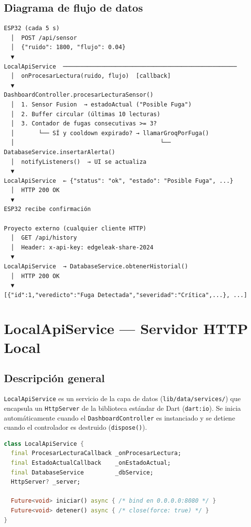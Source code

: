 \documentclass[12pt,a4paper]{article}
\begin{document}
\subsection{Diagrama de flujo de datos}

\begin{mdframed}[linecolor=primaryblue,linewidth=1pt,backgroundcolor=blue!3]
\begin{verbatim}
ESP32 (cada 5 s)
  │  POST /api/sensor
  │  {"ruido": 1800, "flujo": 0.04}
  ▼
LocalApiService  ──────────────────────────────────────────────────
  │  onProcesarLectura(ruido, flujo)  [callback]
  ▼
DashboardController.procesarLecturaSensor()
  │  1. Sensor Fusion  → estadoActual ("Posible Fuga")
  │  2. Buffer circular (últimas 10 lecturas)
  │  3. Contador de fugas consecutivas >= 3?
  │       └── SÍ y cooldown expirado? → llamarGroqPorFuga()
  │                                          └── DatabaseService.insertarAlerta()
  │  notifyListeners()  → UI se actualiza
  ▼
LocalApiService  ← {"status": "ok", "estado": "Posible Fuga", ...}
  │  HTTP 200 OK
  ▼
ESP32 recibe confirmación

Proyecto externo (cualquier cliente HTTP)
  │  GET /api/history
  │  Header: x-api-key: edgeleak-share-2024
  ▼
LocalApiService  → DatabaseService.obtenerHistorial()
  │  HTTP 200 OK
  ▼
[{"id":1,"veredicto":"Fuga Detectada","severidad":"Crítica",...}, ...]
\end{verbatim}
\end{mdframed}

\section{LocalApiService --- Servidor HTTP Local}

\subsection{Descripción general}

\texttt{LocalApiService} es un servicio de la capa de datos (\texttt{lib/data/services/})
que encapsula un \texttt{HttpServer} de la biblioteca estándar de Dart (\texttt{dart:io}).
Se inicia automáticamente cuando el \texttt{DashboardController} es instanciado y se
detiene cuando el controlador es destruido (\texttt{dispose()}).

\begin{lstlisting}[language=Dart, caption={Estructura de LocalApiService}]
class LocalApiService {
  final ProcesarLecturaCallback _onProcesarLectura;
  final EstadoActualCallback    _onEstadoActual;
  final DatabaseService         _dbService;
  HttpServer? _server;

  Future<void> iniciar() async { /* bind en 0.0.0.0:8080 */ }
  Future<void> detener() async { /* close(force: true) */ }
}
\end{lstlisting}
\end{document}
